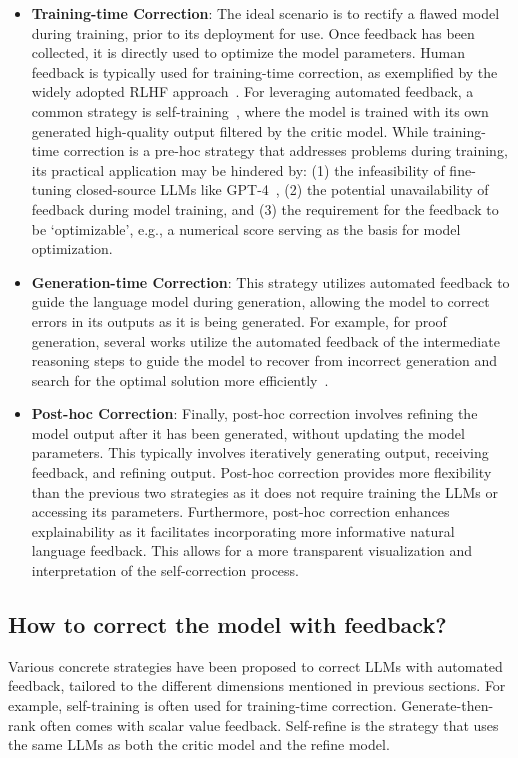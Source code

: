 \documentclass[a4paper,oneside]{book}
\begin{document}
\begin{itemize}
    \item \textbf{Training-time Correction}: The ideal scenario is to rectify a flawed model during training, prior to its deployment for use. Once feedback has been collected, it is directly used to optimize the model parameters. Human feedback is typically used for training-time correction, as exemplified by the widely adopted RLHF approach~\cite{ouyang2022training}. For leveraging automated feedback, a common strategy is self-training~\cite{huang2022large}, where the model is trained with its own generated high-quality output filtered by the critic model. While training-time correction is a pre-hoc strategy that addresses problems during training, its practical application may be hindered by: (1) the infeasibility of fine-tuning closed-source LLMs like GPT-4~\cite{openai2023gpt4}, (2) the potential unavailability of feedback during model training, and (3) the requirement for the feedback to be `optimizable', e.g., a numerical score serving as the basis for model optimization.

    \item \textbf{Generation-time Correction}: This strategy utilizes automated feedback to guide the language model during generation, allowing the model to correct errors in its outputs as it is being generated. For example, for proof generation, several works utilize the automated feedback of the intermediate reasoning steps to guide the model to recover from incorrect generation and search for the optimal solution more efficiently~\cite{yang-etal-2022-generating, lightman2023lets}.

    \item \textbf{Post-hoc Correction}: Finally, post-hoc correction involves refining the model output after it has been generated, without updating the model parameters. This typically involves iteratively generating output, receiving feedback, and refining output. Post-hoc correction provides more flexibility than the previous two strategies as it does not require training the LLMs or accessing its parameters. Furthermore, post-hoc correction enhances explainability as it facilitates incorporating more informative natural language feedback. This allows for a more transparent visualization and interpretation of the self-correction process.
\end{itemize}

\subsection{How to correct the model with feedback?}
Various concrete strategies have been proposed to correct LLMs with automated feedback, tailored to the different dimensions mentioned in previous sections. For example, self-training is often used for training-time correction. Generate-then-rank often comes with scalar value feedback. Self-refine is the strategy that uses the same LLMs as both the critic model and the refine model.
\end{document}
